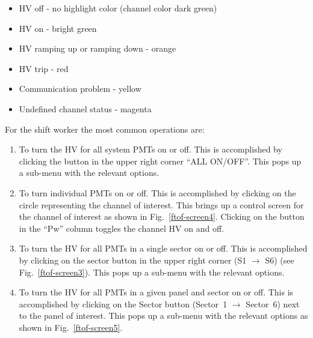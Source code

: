 \documentclass[12pt]{article}
\begin{document}
\begin{itemize}
\item HV off - no highlight color (channel color dark green)
\item HV on - bright green
\item HV ramping up or ramping down - orange
\item HV trip - red
\item Communication problem - yellow
\item Undefined channel status - magenta
\end{itemize}

For the shift worker the most common operations are:

\begin{enumerate}
\item To turn the HV for all system PMTs on or off. This is accomplished by clicking 
the button in the upper right corner ``ALL ON/OFF''. This pops up a sub-menu with the 
relevant options.
\item To turn individual PMTs on or off. This is accomplished by clicking on the circle 
representing the channel of interest. This brings up a control screen for the channel of 
interest as shown in Fig.~\ref{ftof-screen4}. Clicking on the button in the ``Pw''
column toggles the channel HV on and off.
\item To turn the HV for all PMTs in a single sector on or off. This is accomplished 
by clicking on the sector button in the upper right corner (S1 $\to$ S6) (see 
Fig.~\ref{ftof-screen3}). This pops up a sub-menu with the relevant options.
\item To turn the HV for all PMTs in a given panel and sector on or off. This is 
accomplished by clicking on the Sector button (Sector~1 $\to$ Sector~6) next to the 
panel of interest. This pops up a sub-menu with the relevant options as shown in 
Fig.~\ref{ftof-screen5}.
\end{enumerate}
\end{document}

